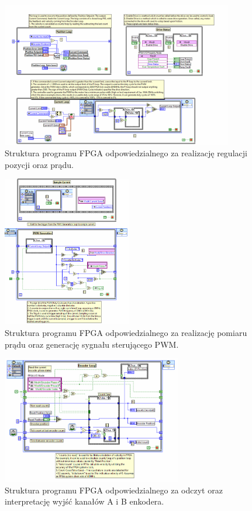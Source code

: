 \documentclass[margin = 2cm]{article}
\begin{document}
	\begin{figure}[H]
		\centering
		\includegraphics[width=0.9\textwidth]{3_3}
		\caption{Struktura programu FPGA odpowiedzialnego za realizację regulacji pozycji oraz prądu.}
	\end{figure}
	\begin{figure}[H]
		\centering
		\includegraphics[width=0.5\textwidth]{3_4}
		\caption{Struktura programu FPGA odpowiedzialnego za realizację pomiaru prądu oraz generację sygnału sterującego PWM.}
	\end{figure}
	\begin{figure}[H]
		\centering
		\includegraphics[width=0.7\textwidth]{3_5}
		\caption{Struktura programu FPGA odpowiedzialnego za odczyt oraz interpretację wyjść kanałów A i B enkodera.}
	\end{figure}
\end{document}
